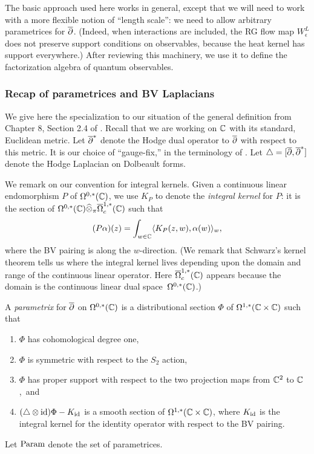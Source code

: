 The basic approach used here works in general, 
except that we will need to work with a more flexible notion of ``length scale'':
we need to allow arbitrary parametrices for $\overline{\partial}$.
(Indeed, when interactions are included, the RG flow map $W_\epsilon^L$ does not preserve support conditions on observables,
because the heat kernel has support everywhere.) 
After reviewing this machinery, we use it to define the factorization algebra of quantum observables.

\subsubsection{Recap of parametrices and BV Laplacians}
\label{parametrices}

We give here the specialization to our situation of the general definition from Chapter 8, Section 2.4 of \cite{CG2}.
Recall that we are working on $\mathbb C$ with its standard, Euclidean metric.
Let $\overline{\partial}^*$ denote the Hodge dual operator to $\overline{\partial}$ with respect
to this metric. It is our choice of ``gauge-fix,'' in the terminology of \cite{CosBook}.
Let $\triangle = [\overline{\partial},\overline{\partial}^*]$ denote the Hodge Laplacian on Dolbeault forms.

We remark on our convention for integral kernels.
Given a continuous linear endomorphism $P$ of $\Omega^{0,*}(\mathbb C)$, 
we use $K_P$ to denote the \emph{integral kernel} for $P$:
it is the section of $\Omega^{0,*}(\mathbb C) \widehat{\otimes}_\pi \overline{\Omega}^{1,*}_c(\mathbb C)$ such that
\[
(P\alpha)(z) = \int_{w \in \mathbb C} \langle K_P(z,w), \alpha(w)\rangle_w,
\]
where the BV pairing is along the $w$-direction.
(We remark that Schwarz's kernel theorem tells us where the integral kernel lives depending upon the domain and range of the continuous linear operator.  
Here $\overline{\Omega}^{1,*}_c(\mathbb C)$ appears because the domain is the continuous linear dual space~$\Omega^{0,*}(\mathbb C)$.)

\begin{dfn}
A {\em parametrix} for $\overline{\partial}$ on $\Omega^{0,*}(\mathbb C)$ is a distributional section $\Phi$ of
$\Omega^{1,*}(\mathbb C \times \mathbb C)$ such that
\begin{enumerate}
\item $\Phi$ has cohomological degree one,
\item $\Phi$ is symmetric with respect to the $S_2$ action,
\item $\Phi$ has proper support with respect to the two projection maps from $\mathbb C^2$ to $\mathbb C$,~and
\item $(\triangle \otimes {\rm id}) \Phi - K_{{\rm id}}$ is a smooth section of $\Omega^{1,*}(\mathbb C \times \mathbb C)$,
where $K_{{\rm id}}$ is the integral kernel for the identity operator with respect to the BV pairing.
\end{enumerate}
Let ${\rm Param}$ denote the set of parametrices.
\end{dfn}

